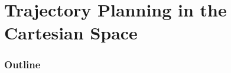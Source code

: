 \documentclass[10pt, aspectratio=169]{beamer}
\theoremstyle{remark}
\theoremstyle{definition}
\begin{document}
\section{Trajectory Planning in the Cartesian Space}
\begin{frame}
	\frametitle{Outline} %
	\tableofcontents[currentsection] %
\end{frame}
\end{document}
